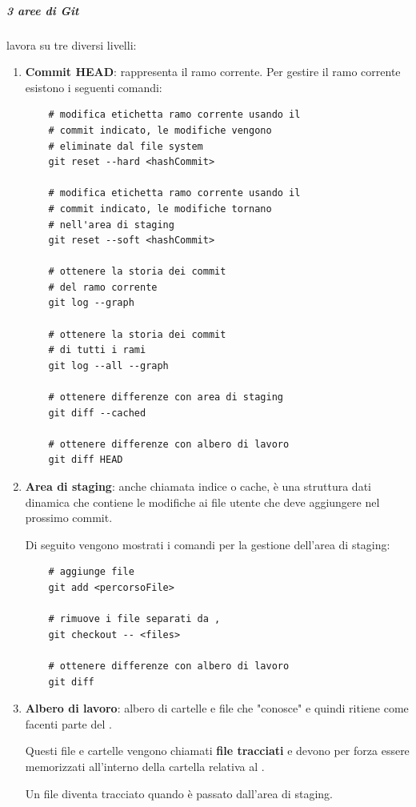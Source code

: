 \subparagraph{3 aree di Git}
\label{subpar:3_aree_git}
 lavora su tre diversi livelli:
\begin{enumerate}
    \item \textbf{Commit HEAD}: rappresenta il ramo corrente.
    Per gestire il ramo corrente esistono i seguenti comandi:
    \begin{lstlisting}
    # modifica etichetta ramo corrente usando il
    # commit indicato, le modifiche vengono 
    # eliminate dal file system
    git reset --hard <hashCommit>

    # modifica etichetta ramo corrente usando il
    # commit indicato, le modifiche tornano 
    # nell'area di staging 
    git reset --soft <hashCommit>

    # ottenere la storia dei commit 
    # del ramo corrente
    git log --graph
    
    # ottenere la storia dei commit 
    # di tutti i rami
    git log --all --graph

    # ottenere differenze con area di staging
    git diff --cached
    
    # ottenere differenze con albero di lavoro
    git diff HEAD
    \end{lstlisting}
    
    \item \textbf{Area di staging}: anche chiamata indice o cache, è una struttura dati dinamica che contiene le modifiche ai file utente che  deve aggiungere nel prossimo commit.
    
    Di seguito vengono mostrati i comandi per la gestione dell'area di staging:
    \begin{lstlisting}
    # aggiunge file
    git add <percorsoFile>

    # rimuove i file separati da ,
    git checkout -- <files>

    # ottenere differenze con albero di lavoro
    git diff 
    \end{lstlisting}
    
    \item \textbf{Albero di lavoro}: albero di cartelle e file che  "conosce" e quindi ritiene come facenti parte del .
    
    Questi file e cartelle vengono chiamati \textbf{file tracciati} e devono per forza essere memorizzati all'interno della cartella relativa al .

    Un file diventa tracciato quando è passato dall'area di staging.
\end{enumerate}


